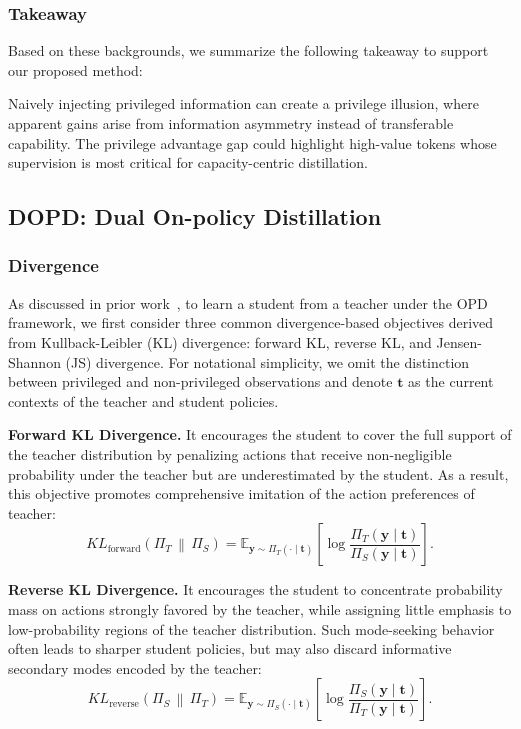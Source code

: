 \documentclass{llmxive}
\begin{document}
\subsubsection{Takeaway}
Based on these backgrounds, we summarize the following takeaway to support our proposed method:
\begin{takeaway}
Naively injecting privileged information can create a privilege illusion, where apparent gains arise from information asymmetry instead of transferable capability. The privilege advantage gap could highlight high-value tokens whose supervision is most critical for capacity-centric distillation.
\end{takeaway}



\subsection{DOPD: Dual On-policy Distillation}
\label{sec:dopd}
\subsubsection{Divergence}
As discussed in prior work~\citep{hubotter2026reinforcement,jin2026entropy,li2026rethinking}, to learn a student from a teacher under the OPD framework, we first consider three common divergence-based objectives derived from Kullback-Leibler (KL) divergence: forward KL, reverse KL, and Jensen-Shannon (JS) divergence. For notational simplicity, we omit the distinction between privileged and non-privileged observations and denote $\mathbf{t}$ as the current contexts of the teacher and student policies.



\noindent\textbf{Forward KL Divergence.}
It encourages the student to cover the full support of the teacher distribution by penalizing actions that receive non-negligible probability under the teacher but are underestimated by the student. As a result, this objective promotes comprehensive imitation of the action preferences of teacher:
\begin{equation}
    KL_{\mathrm{forward}}\left(\Pi_{T}\,\middle\|\,\Pi_{S}\right) = \mathbb{E}_{\mathbf{y} \sim \Pi_{T}\left(\cdot \mid \mathbf{t}\right)} \left[ \log \frac{ \Pi_{T}\left(\mathbf{y} \mid \mathbf{t}\right) }{ \Pi_{S}\left(\mathbf{y} \mid \mathbf{t}\right) } \right].
\end{equation}

\noindent\textbf{Reverse KL Divergence.}
It encourages the student to concentrate probability mass on actions strongly favored by the teacher, while assigning little emphasis to low-probability regions of the teacher distribution. Such mode-seeking behavior often leads to sharper student policies, but may also discard informative secondary modes encoded by the teacher:
\begin{equation}
    KL_{\mathrm{reverse}} \left(\Pi_{S}\,\middle\|\,\Pi_{T}\right) = \mathbb{E}_{\mathbf{y} \sim \Pi_{S}\left(\cdot \mid \mathbf{t}\right)} \left[ \log \frac{ \Pi_{S}\left(\mathbf{y} \mid \mathbf{t}\right) }{ \Pi_{T}\left(\mathbf{y} \mid \mathbf{t}\right) } \right].
\end{equation}
\end{document}

